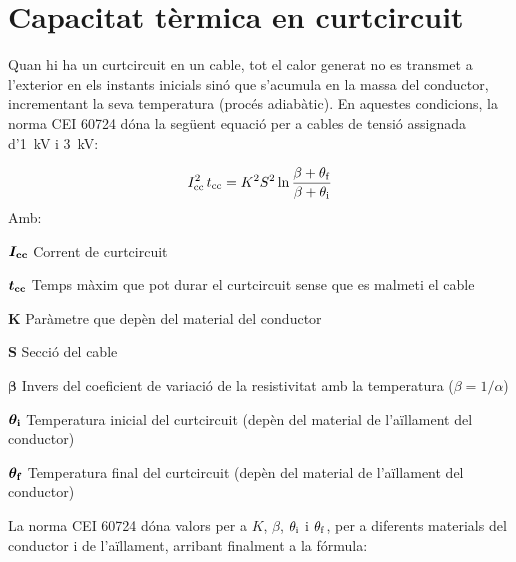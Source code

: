 \section{Capacitat tèrmica en curtcircuit}\label{ces:cables_Icc_termica}

Quan hi ha un curtcircuit en un cable, tot el calor generat no es transmet a l'exterior en els instants inicials sinó que s'acumula en la massa del conductor, incrementant la seva temperatura (procés adiabàtic). En aquestes condicions, la norma CEI 60724 dóna la següent equació per a cables de tensió assignada d'\SI{1}{kV} i \SI{3}{kV}:

\begin{equation}
   I_\mathrm{cc}^2 \,t_\mathrm{cc} = K^2 S^2 \ln \frac{\beta + \theta_\mathrm{f}}{\beta + \theta_\mathrm{i}}
\end{equation}
Amb:

\begin{list}{}
   {\setlength{\labelwidth}{10mm} \setlength{\leftmargin}{12mm} \setlength{\labelsep}{2mm}}
   \item[\hspace{5mm}$\boldsymbol{I_\mathrm{cc}}$\hfill] Corrent de curtcircuit
   \item[\hspace{5mm}$\boldsymbol{t_\mathrm{cc}}$\hfill] Temps màxim que pot durar el curtcircuit sense que es malmeti el cable
   \item[\hspace{5mm}$\boldsymbol{K}$\hfill] Paràmetre que depèn del material del conductor
   \item[\hspace{5mm}$\boldsymbol{S}$\hfill] Secció del cable
   \item[\hspace{5mm}$\boldsymbol{\beta}$\hfill] Invers del coeficient de variació de la resistivitat amb la temperatura ($\beta = 1/ \alpha$)
   \item[\hspace{5mm}$\boldsymbol{\theta_\mathrm{i}}$\hfill] Temperatura inicial del curtcircuit (depèn del material de l'aïllament del conductor)
   \item[\hspace{5mm}$\boldsymbol{\theta_\mathrm{f}}$\hfill] Temperatura final del curtcircuit (depèn del material de l'aïllament del conductor)
\end{list}

La norma CEI 60724 dóna valors per a $K$, $\beta$, $\theta_\mathrm{i}$ i $\theta_\mathrm{f}$, per a diferents materials del conductor i de l'aïllament, arribant finalment a la fórmula:


